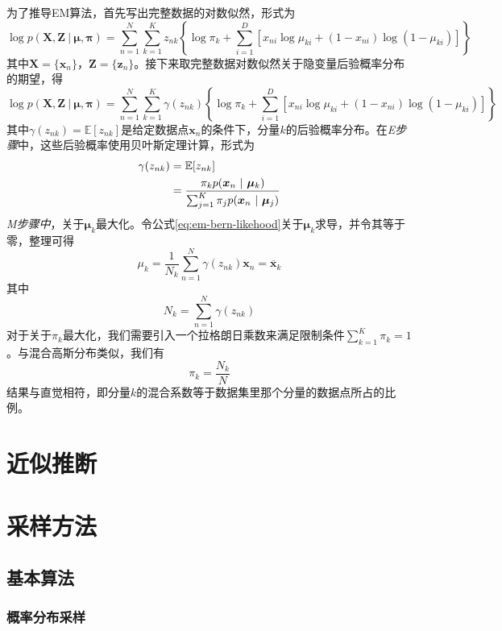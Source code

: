 \documentclass[11pt]{ctexbook}
\begin{document}
为了推导EM算法，首先写出完整数据的对数似然，形式为
\begin{equation}
	\log p(\bm X, \bm Z\ |\ \bm\mu, \bm\pi) = \sum_{n=1}^{N}\sum_{k=1}^K z_{nk}\left\{ \log \pi_k + \sum_{i=1}^D\left[x_{ni}\log\mu_{ki}+(1-x_{ni})\log(1-\mu_{ki})\right] \right\}
\end{equation}
其中$\bm X= \{\bm x_n\}$，$\bm Z=\{\bm z_n\}$。接下来取完整数据对数似然关于隐变量后验概率分布的期望，得
\begin{equation}
	\label{eq:em-bern-likehood}
	\log p(\bm X, \bm Z\ |\ \bm\mu, \bm\pi) = \sum_{n=1}^{N}\sum_{k=1}^K\gamma(z_{nk})\left\{ \log \pi_k + \sum_{i=1}^D\left[x_{ni}\log\mu_{ki}+(1-x_{ni})\log(1-\mu_{ki})\right] \right\}
\end{equation}
其中$\gamma(z_{nk})=\mathbb E[z_{nk}]$是给定数据点$\bm x_n$的条件下，分量$k$的后验概率分布。在\emph{E步骤}中，这些后验概率使用贝叶斯定理计算，形式为
\begin{align}
	\gamma(z_{nk}) &= \mathbb E[z_{nk}] \notag \\
	&= \frac{\pi_k p(\bm x_n\ |\ \bm\mu_k)}{\sum_{j=1}^K\pi_j p(\bm x_n\ |\ \bm\mu_j)}
\end{align}
\emph{M步骤中}，关于$\bm\mu_k$最大化。令公式\ref{eq:em-bern-likehood}关于$\bm\mu_k$求导，并令其等于零，整理可得
\begin{equation}
	\mu_k = \frac{1}{N_k}\sum_{n=1}^N\gamma(z_{nk})\bm x_n = \overline{\bm x}_k
\end{equation}
其中
\begin{equation}
	N_k = \sum_{n=1}^{N}\gamma(z_{nk})
\end{equation}
对于关于$\pi_k$最大化，我们需要引入一个拉格朗日乘数来满足限制条件$\sum_{k=1}^K\pi_k=1$。与混合高斯分布类似，我们有
\begin{equation}
	\pi_k = \frac{N_k}{N}
\end{equation}
结果与直觉相符，即分量$k$的混合系数等于数据集里那个分量的数据点所占的比例。
\chapter{近似推断}

\chapter{采样方法}
\section{基本算法}
\subsection{概率分布采样}
\end{document}
